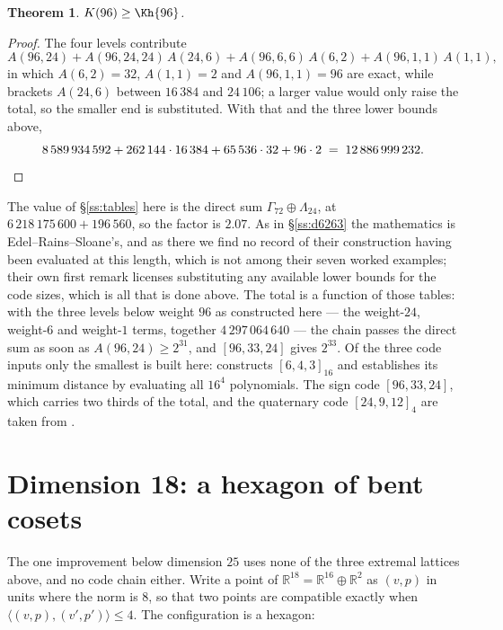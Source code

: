 \documentclass[11pt]{amsart}
\newtheorem{theorem}{Theorem}[section]
\theoremstyle{remark}
\newcommand{\Leech}{\Lambda_{24}}
\newcommand{\Gsz}{\Gamma_{72}}
\newcommand{\ip}[2]{\langle #1,#2\rangle}
\newcommand{\R}{\mathbb{R}}
\begin{document}
\begin{theorem}\label{thm:96}
$K(96)\ge\Kh{96}$.
\end{theorem}

\begin{proof}
The four levels contribute
\[
  A(96,24)+A(96,24,24)\,A(24,6)+A(96,6,6)\,A(6,2)+A(96,1,1)\,A(1,1),
\]
in which $A(6,2)=32$, $A(1,1)=2$ and $A(96,1,1)=96$ are exact, while \cite{brouwer}
brackets $A(24,6)$ between $16\,384$ and $24\,106$; a larger value would only raise
the total, so the smaller end is substituted. With that and the three lower bounds
above,
\[
  8\,589\,934\,592+262\,144\cdot16\,384+65\,536\cdot32+96\cdot2
  \;=\;12\,886\,999\,232 . \qedhere
\]
\end{proof}

The value of \S\ref{ss:tables} here is the direct sum $\Gsz\oplus\Leech$, at
$6\,218\,175\,600+196\,560$, so the factor is $2.07$. As in \S\ref{ss:d6263} the
mathematics is Edel--Rains--Sloane's, and as there we find no record of their
construction having been evaluated at this length, which is not among their seven
worked examples; their own first
remark licenses substituting any available lower bounds for the code sizes, which
is all that is done above. The total is a function of those tables: with the three
levels below weight $96$ as constructed here --- the weight-$24$, weight-$6$ and
weight-$1$ terms, together $4\,297\,064\,640$ --- the chain passes the direct sum
as soon as $A(96,24)\ge2^{31}$, and $[96,33,24]$ gives $2^{33}$. Of the three code inputs only the smallest is
built here: \cite{repo} constructs $[6,4,3]_{16}$ and establishes its minimum distance
by evaluating all $16^4$ polynomials. The sign code $[96,33,24]$, which carries two
thirds of the total, and the quaternary code $[24,9,12]_4$ are taken from \cite{codetables}.

\section{Dimension 18: a hexagon of bent cosets}\label{sec:d18}

The one improvement below dimension $25$ uses none of the three extremal lattices
above, and no code chain either.
Write a point of $\R^{18}=\R^{16}\oplus\R^{2}$ as $(v,p)$ in units where the norm
is $8$, so that two points are compatible exactly when $\ip{(v,p)}{(v',p')}\le4$.
The configuration is a hexagon:
\end{document}

